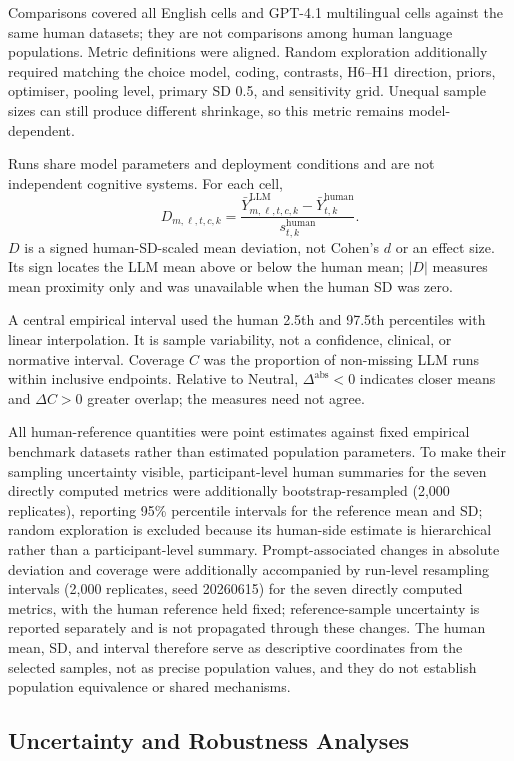 \documentclass[logo,msc,inf]{infthesis}       %
\begin{document}
Comparisons covered all English cells and GPT-4.1 multilingual cells against the same human datasets; they are not comparisons among human language populations. Metric definitions were aligned. Random exploration additionally required matching the choice model, coding, contrasts, H6--H1 direction, priors, optimiser, pooling level, primary SD 0.5, and sensitivity grid. Unequal sample sizes can still produce different shrinkage, so this metric remains model-dependent.

Runs share model parameters and deployment conditions and are not independent cognitive systems. For each cell,
\[
D_{m,\ell,t,c,k}=\frac{\bar Y^{\mathrm{LLM}}_{m,\ell,t,c,k}-\bar Y^{\mathrm{human}}_{t,k}}{s^{\mathrm{human}}_{t,k}}.
\]
$D$ is a signed human-SD-scaled mean deviation, not Cohen's $d$ or an effect size. Its sign locates the LLM mean above or below the human mean; $|D|$ measures mean proximity only and was unavailable when the human SD was zero.

A central empirical interval used the human 2.5th and 97.5th percentiles with linear interpolation. It is sample variability, not a confidence, clinical, or normative interval. Coverage $C$ was the proportion of non-missing LLM runs within inclusive endpoints. Relative to Neutral, $\Delta^{\mathrm{abs}}<0$ indicates closer means and $\Delta C>0$ greater overlap; the measures need not agree.

All human-reference quantities were point estimates against fixed empirical benchmark datasets rather than estimated population parameters. To make their sampling uncertainty visible, participant-level human summaries for the seven directly computed metrics were additionally bootstrap-resampled (2,000 replicates), reporting 95\% percentile intervals for the reference mean and SD; random exploration is excluded because its human-side estimate is hierarchical rather than a participant-level summary. Prompt-associated changes in absolute deviation and coverage were additionally accompanied by run-level resampling intervals (2,000 replicates, seed 20260615) for the seven directly computed metrics, with the human reference held fixed; reference-sample uncertainty is reported separately and is not propagated through these changes. The human mean, SD, and interval therefore serve as descriptive coordinates from the selected samples, not as precise population values, and they do not establish population equivalence or shared mechanisms.

\subsection{Uncertainty and Robustness Analyses}
\end{document}

